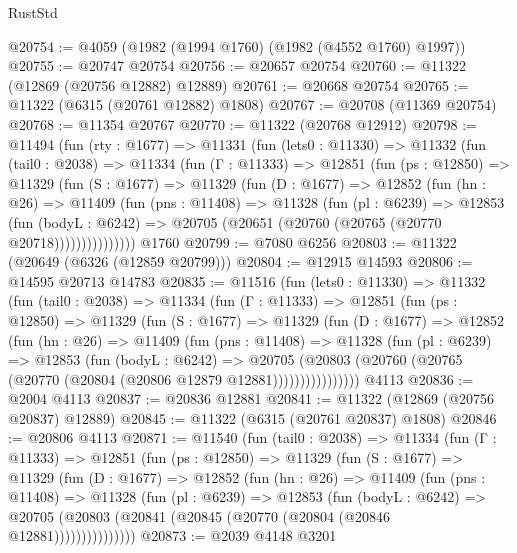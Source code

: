\begin{lexlean}{RustStd}
\begin{coremodule}
@20754 := @4059 (@1982 (@1994 @1760) (@1982 (@4552 @1760) @1997))
@20755 := @20747 @20754
@20756 := @20657 @20754
@20760 := @11322 (@12869 (@20756 @12882) @12889)
@20761 := @20668 @20754
@20765 := @11322 (@6315 (@20761 @12882) @1808)
@20767 := @20708 (@11369 @20754)
@20768 := @11354 @20767
@20770 := @11322 (@20768 @12912)
@20798 := @11494
    (fun (rty : @1677) =>
    @11331
      (fun (lets0 : @11330) =>
      @11332
        (fun (tail0 : @2038) =>
        @11334
          (fun (Γ : @11333) =>
          @12851
            (fun (ps : @12850) =>
            @11329
              (fun (S : @1677) =>
              @11329
                (fun (D : @1677) =>
                @12852
                  (fun (hn : @26) =>
                  @11409
                    (fun (pns : @11408) =>
                    @11328
                      (fun (pl : @6239) =>
                      @12853
                        (fun (bodyL : @6242) =>
                        @20705 (@20651 (@20760 (@20765 (@20770 @20718)))))))))))))))
    @1760
@20799 := @7080 @6256
@20803 := @11322 (@20649 (@6326 (@12859 @20799)))
@20804 := @12915 @14593
@20806 := @14595 @20713 @14783
@20835 := @11516
    (fun (lets0 : @11330) =>
    @11332
      (fun (tail0 : @2038) =>
      @11334
        (fun (Γ : @11333) =>
        @12851
          (fun (ps : @12850) =>
          @11329
            (fun (S : @1677) =>
            @11329
              (fun (D : @1677) =>
              @12852
                (fun (hn : @26) =>
                @11409
                  (fun (pns : @11408) =>
                  @11328
                    (fun (pl : @6239) =>
                    @12853
                      (fun (bodyL : @6242) =>
                      @20705
                        (@20803
                          (@20760 (@20765 (@20770 (@20804 (@20806 @12879 @12881))))))))))))))))
    @4113
@20836 := @2004 @4113
@20837 := @20836 @12881
@20841 := @11322 (@12869 (@20756 @20837) @12889)
@20845 := @11322 (@6315 (@20761 @20837) @1808)
@20846 := @20806 @4113
@20871 := @11540
    (fun (tail0 : @2038) =>
    @11334
      (fun (Γ : @11333) =>
      @12851
        (fun (ps : @12850) =>
        @11329
          (fun (S : @1677) =>
          @11329
            (fun (D : @1677) =>
            @12852
              (fun (hn : @26) =>
              @11409
                (fun (pns : @11408) =>
                @11328
                  (fun (pl : @6239) =>
                  @12853
                    (fun (bodyL : @6242) =>
                    @20705 (@20803 (@20841 (@20845 (@20770 (@20804 (@20846 @12881)))))))))))))))
@20873 := @2039 @4148 @3201

\end{coremodule}
\end{lexlean}
